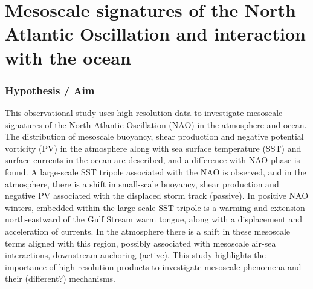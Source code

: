\chapter{Mesoscale signatures of the North Atlantic Oscillation and interaction with the ocean}

\graphicspath{{Chapter4/Figs/}}


\subsection{ Hypothesis / Aim}


%
%


This observational study uses high resolution data to investigate mesoscale signatures of the North Atlantic Oscillation (NAO) in the atmosphere and ocean.  The distribution of mesoscale buoyancy, shear production and negative potential vorticity (PV) in the atmosphere along with sea surface temperature (SST) and surface currents in the ocean are described, and a difference with NAO phase is found.
A large-scale SST tripole associated with the NAO is observed, and in the atmosphere, there is a shift in small-scale buoyancy, shear production and negative PV associated with the displaced storm track (passive). In positive NAO winters, embedded within the large-scale SST tripole is a warming and extension north-eastward of the Gulf Stream warm tongue,  along with a displacement and acceleration of currents. In the atmosphere there is a shift in these mesoscale terms aligned with this region, possibly associated with mesoscale air-sea interactions, downstream anchoring (active).
This study highlights the importance of high resolution products to investigate mesoscale phenomena and their (different?) mechanisms.

